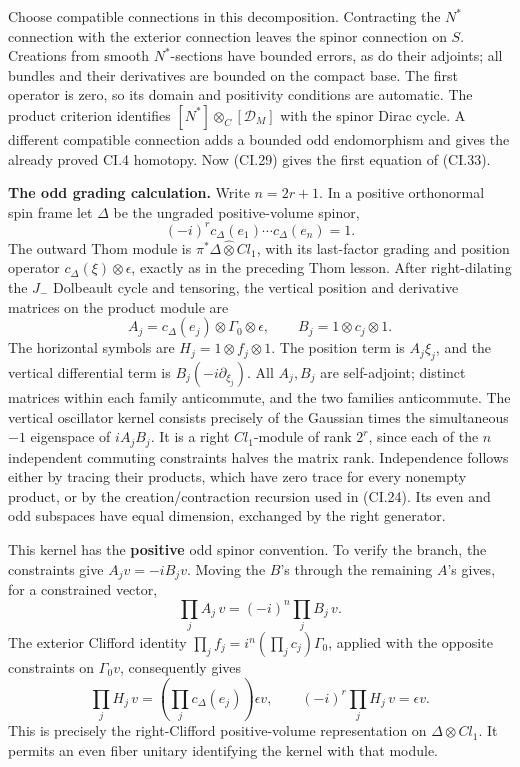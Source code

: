 \documentclass[
  11pt,
]{article}
\begin{document}
Choose compatible connections in this decomposition. Contracting the
\(N^*\) connection with the exterior connection leaves the spinor
connection on \(S\). Creations from smooth \(N^*\)-sections have bounded
errors, as do their adjoints; all bundles and their derivatives are
bounded on the compact base. The first operator is zero, so its domain
and positivity conditions are automatic. The product criterion
identifies \([N^*]\otimes_C[\mathscr D_M]\) with the spinor Dirac cycle.
A different compatible connection adds a bounded odd endomorphism and
gives the already proved CI.4 homotopy. Now (CI.29) gives the first
equation of (CI.33).

\textbf{The odd grading calculation.} Write \(n=2r+1\). In a positive
orthonormal spin frame let \(\Delta\) be the ungraded positive-volume
spinor, \[
 (-i)^r c_\Delta(e_1)\cdots c_\Delta(e_n)=1.
\] The outward Thom module is \(\pi^*\Delta\widehat\otimes Cl_1\), with
its last-factor grading and position operator
\(c_\Delta(\xi)\otimes\epsilon\), exactly as in the preceding Thom
lesson. After right-dilating the \(J_-\) Dolbeault cycle and tensoring,
the vertical position and derivative matrices on the product module are
\[
 A_j=c_\Delta(e_j)\otimes\Gamma_0\otimes\epsilon,\qquad
 B_j=1\otimes c_j\otimes1.
 \tag{CI.34}
\] The horizontal symbols are \(H_j=1\otimes f_j\otimes1\). The position
term is \(A_j\xi_j\), and the vertical differential term is
\(B_j(-i\partial_{\xi_j})\). All \(A_j,B_j\) are self-adjoint; distinct
matrices within each family anticommute, and the two families
anticommute. The vertical oscillator kernel consists precisely of the
Gaussian times the simultaneous \(-1\) eigenspace of \(iA_jB_j\). It is
a right \(Cl_1\)-module of rank \(2^r\), since each of the \(n\)
independent commuting constraints halves the matrix rank. Independence
follows either by tracing their products, which have zero trace for
every nonempty product, or by the creation/contraction recursion used in
(CI.24). Its even and odd subspaces have equal dimension, exchanged by
the right generator.

This kernel has the \textbf{positive} odd spinor convention. To verify
the branch, the constraints give \(A_jv=-iB_jv\). Moving the \(B\)'s
through the remaining \(A\)'s gives, for a constrained vector, \[
 \prod_jA_j\,v=(-i)^n\prod_jB_j\,v.
\] The exterior Clifford identity
\(\prod_j f_j=i^n(\prod_jc_j)\Gamma_0\), applied with the opposite
constraints on \(\Gamma_0v\), consequently gives \[
 \prod_jH_j\,v
   =\left(\prod_jc_\Delta(e_j)\right)\epsilon v,\qquad
 (-i)^r\prod_jH_j\,v=\epsilon v.
 \tag{CI.35}
\] This is precisely the right-Clifford positive-volume representation
on \(\Delta\otimes Cl_1\). It permits an even fiber unitary identifying
the kernel with that module.
\end{document}

